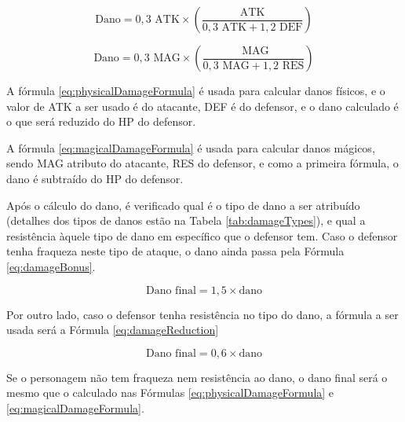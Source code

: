 \documentclass[
	12pt,					%
	openright,				%
	oneside,				%
	a4paper,				%
	bibjustif,				%
	chapter=TITLE,			%
	english,				%
	brazil,					%
	]{abntex2}
\begin{document}
	\begin{equation}
		\textrm{Dano} = 0,3 \textrm{ ATK} \times \left(\frac{\textrm{ATK}}{0,3 \textrm{ ATK} + 1,2 \textrm{ DEF}}\right)
		\label{eq:physicalDamageFormula}
	\end{equation}
	
	\begin{equation}
		\textrm{Dano} = 0,3 \textrm{ MAG} \times \left(\frac{\textrm{ MAG}}{0,3 \textrm{ MAG} + 1,2 \textrm{ RES}}\right)
		\label{eq:magicalDamageFormula}
	\end{equation}
	
	\vspace{3mm}
	
	A fórmula \eqref{eq:physicalDamageFormula} é usada para calcular danos físicos,
	e o valor de ATK a ser usado é do atacante,
	DEF é do defensor,
	e o dano calculado é o que será reduzido do HP do defensor.
	
	A fórmula \eqref{eq:magicalDamageFormula} é usada para calcular danos mágicos,
	sendo MAG atributo do atacante,
	RES do defensor,
	e como a primeira fórmula, o dano é subtraído do HP do defensor.
	
	Após o cálculo do dano,
	é verificado qual é o tipo de dano a ser atribuído
	(detalhes dos tipos de danos estão na Tabela \ref{tab:damageTypes}),
	e qual a resistência àquele tipo de dano em específico que o defensor tem.
	Caso o defensor tenha fraqueza neste tipo de ataque,
	o dano ainda passa pela Fórmula \eqref{eq:damageBonus}.
	
	\begin{equation}
		\textrm{Dano final} = 1,5 \times \textrm{dano}
		\label{eq:damageBonus}
	\end{equation}
	
	\vspace{3mm}
	
	Por outro lado, caso o defensor tenha resistência no tipo do dano,
	a fórmula a ser usada será a Fórmula \eqref{eq:damageReduction}
	
	\begin{equation}
		\textrm{Dano final} = 0,6 \times \textrm{dano}
		\label{eq:damageReduction}
	\end{equation}
	
	\vspace{3mm}
	
	Se o personagem não tem fraqueza nem resistência ao dano,
	o dano final será o mesmo que o calculado nas Fórmulas \eqref{eq:physicalDamageFormula} e \eqref{eq:magicalDamageFormula}.
	
\end{document}
